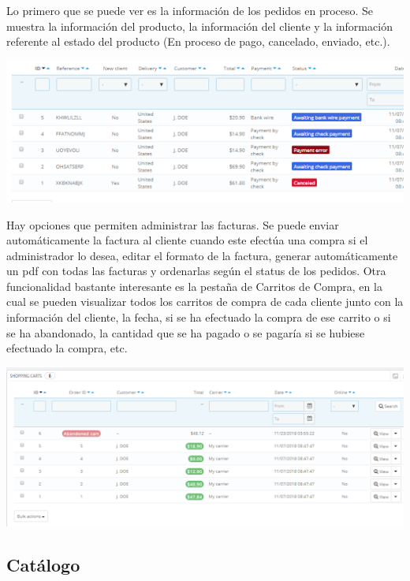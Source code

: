 \documentclass{article}
\begin{document}
Lo primero que se puede ver es la información de los pedidos en proceso. Se muestra la información del producto, la información del cliente y la información referente al estado del producto (En proceso de pago, cancelado, enviado, etc.).

\begin{center}
\includegraphics[scale=0.8]{images/facturas.png}
\end{center}

Hay opciones que permiten administrar las facturas. Se puede enviar automáticamente la factura al cliente cuando este efectúa una compra si el administrador lo desea, editar el formato de la factura, generar automáticamente un pdf con todas las facturas y ordenarlas según el status de los pedidos.
Otra funcionalidad bastante interesante es la pestaña de Carritos de Compra, en la cual se pueden visualizar todos los carritos de compra de cada cliente junto con la información del cliente, la fecha, si se ha efectuado la compra de ese carrito o si se ha abandonado, la cantidad que se ha pagado o se pagaría si se hubiese efectuado la compra, etc.

\begin{center}
\includegraphics[scale=0.8]{images/facturas2.png}
\end{center}

\subsection{Catálogo}
\end{document}
